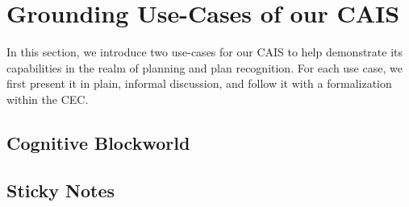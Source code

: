 \chapter{Grounding Use-Cases of our CAIS}\label{chap:use_cases}

In this section, we introduce two use-cases for our CAIS to help demonstrate
its capabilities in the realm of planning and plan recognition. For each
use case, we first present it in plain, informal discussion, and follow it
with a formalization within the CEC.

\section{Cognitive Blockworld}



\section{Sticky Notes}


